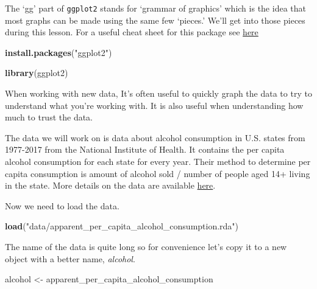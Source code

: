 \documentclass[
  12pt,
]{book}
\newenvironment{Shaded}{\begin{snugshade}}{\end{snugshade}}
\newcommand{\KeywordTok}[1]{\textcolor[rgb]{0.27,0.27,0.27}{\textbf{#1}}}
\newcommand{\NormalTok}[1]{#1}
\newcommand{\StringTok}[1]{\textcolor[rgb]{0.5,0.5,0.5}{#1}}
\begin{document}
The `gg' part of \texttt{ggplot2} stands for `grammar of graphics' which is the idea that most graphs can be made using the same few `pieces.' We'll get into those pieces during this lesson. For a useful cheat sheet for this package see \href{https://www.rstudio.com/wp-content/uploads/2015/03/ggplot2-cheatsheet.pdf}{here}

\begin{Shaded}
\begin{Highlighting}[]
\KeywordTok{install.packages}\NormalTok{(}\StringTok{"ggplot2"}\NormalTok{)}
\end{Highlighting}
\end{Shaded}

\begin{Shaded}
\begin{Highlighting}[]
\KeywordTok{library}\NormalTok{(ggplot2)}
\end{Highlighting}
\end{Shaded}

When working with new data, It's often useful to quickly graph the data to try to understand what you're working with. It is also useful when understanding how much to trust the data.

The data we will work on is data about alcohol consumption in U.S. states from 1977-2017 from the National Institute of Health. It contains the per capita alcohol consumption for each state for every year. Their method to determine per capita consumption is amount of alcohol sold / number of people aged 14+ living in the state. More details on the data are available \href{https://www.openicpsr.org/openicpsr/project/105583/version/V2/view}{here}.

Now we need to load the data.

\begin{Shaded}
\begin{Highlighting}[]
\KeywordTok{load}\NormalTok{(}\StringTok{"data/apparent\_per\_capita\_alcohol\_consumption.rda"}\NormalTok{)}
\end{Highlighting}
\end{Shaded}

The name of the data is quite long so for convenience let's copy it to a new object with a better name, \emph{alcohol}.

\begin{Shaded}
\begin{Highlighting}[]
\NormalTok{alcohol <{-}}\StringTok{ }\NormalTok{apparent\_per\_capita\_alcohol\_consumption}
\end{Highlighting}
\end{Shaded}
\end{document}

